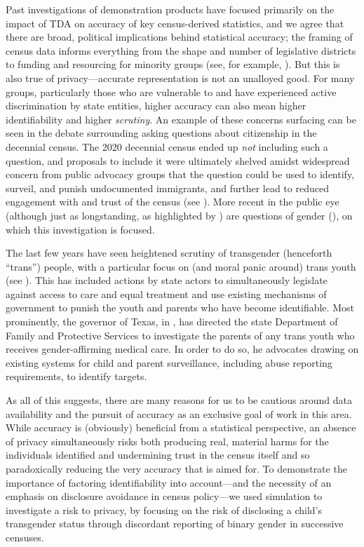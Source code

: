 \documentclass{jpc} %
\theoremstyle{plain}\newtheorem{satz}[thm]{Satz} %
\begin{document}
Past investigations of demonstration products have focused primarily on the impact of TDA on accuracy of key census-derived statistics,
and we agree that there are broad, political implications behind statistical accuracy; the framing of census data informs everything from the shape and number of legislative districts to funding and resourcing for minority groups (see, for example, \cite{thompson2012making}). But this is also true of privacy---accurate representation is not an unalloyed good. For many groups, particularly those who are vulnerable to and have experienced active discrimination by state entities, higher accuracy can also mean higher identifiability and higher \textit{scrutiny}. An example of these concerns surfacing can be seen in the debate surrounding asking questions about citizenship in the decennial census. The 2020 decennial census ended up \emph{not} including such a question, and proposals to include it were ultimately shelved amidst widespread concern from public advocacy groups that the question could be used to identify, surveil, and punish undocumented immigrants, and further lead to reduced engagement with and trust of the census (see \cite{levitt2019citizenship,baum2022sensitive}). More recent in the public eye (although just as longstanding, as highlighted by \cite{canaday2009straight}) are questions of gender (\cite{singer2015profusion}), on which this investigation is focused.

The last few years have seen heightened scrutiny of transgender (henceforth ``trans'') people, with a particular focus on (and moral panic around) trans youth (see \cite{slothouber2020trans}). This has included actions by state actors to simultaneously legislate against access to care and equal treatment and use existing mechanisms of government to punish the youth and parents who have become identifiable. Most prominently, the governor of Texas, in \cite{abbottletter}, has directed the state Department of Family and Protective Services to investigate the parents of any trans youth who receives gender-affirming medical care. In order to do so, he advocates drawing on existing systems for child and parent surveillance, including abuse reporting requirements, to identify targets.

As all of this suggests, there are many reasons for us to be cautious around data availability and the pursuit of accuracy as an exclusive goal of work in this area. While accuracy is (obviously) beneficial from a statistical perspective, an absence of privacy simultaneously risks both producing real, material harms for the individuals identified and undermining trust in the census itself and so paradoxically reducing the very accuracy that is aimed for. To demonstrate the importance of factoring identifiability into account---and the necessity of an emphasis on disclosure avoidance in census policy---we used simulation to investigate a risk to privacy, by focusing on the risk of disclosing a child's transgender status through discordant reporting of binary gender in successive censuses.
\end{document}
